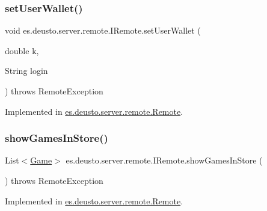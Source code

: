 \mbox{\label{interfacees_1_1deusto_1_1server_1_1remote_1_1_i_remote_a6252daae1e76aee233294482f661160a}} 
\subsubsection{\texorpdfstring{set\+User\+Wallet()}{setUserWallet()}}
{\footnotesize\ttfamily void es.\+deusto.\+server.\+remote.\+I\+Remote.\+set\+User\+Wallet (\begin{DoxyParamCaption}\item[{double}]{k,  }\item[{String}]{login }\end{DoxyParamCaption}) throws Remote\+Exception}



Implemented in \hyperlink{classes_1_1deusto_1_1server_1_1remote_1_1_remote_aceab50768f98f50ff144b079f229c249}{es.\+deusto.\+server.\+remote.\+Remote}.

\mbox{\label{interfacees_1_1deusto_1_1server_1_1remote_1_1_i_remote_a091249da31b567c1be29e07085d3ff18}} 
\subsubsection{\texorpdfstring{show\+Games\+In\+Store()}{showGamesInStore()}}
{\footnotesize\ttfamily List$<$\hyperlink{classes_1_1deusto_1_1server_1_1db_1_1data_1_1_game}{Game}$>$ es.\+deusto.\+server.\+remote.\+I\+Remote.\+show\+Games\+In\+Store (\begin{DoxyParamCaption}{ }\end{DoxyParamCaption}) throws Remote\+Exception}



Implemented in \hyperlink{classes_1_1deusto_1_1server_1_1remote_1_1_remote_ae40a5882d6b3ef3d5928d87dafeb15fa}{es.\+deusto.\+server.\+remote.\+Remote}.

